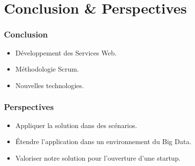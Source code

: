 \documentclass{beamer}
\begin{document}
\section{Conclusion \& Perspectives}

\begin{frame}
    \frametitle{Conclusion}
    \begin{itemize}
        \item<1-> Développement des Services Web.
        \item<2-> Méthodologie Scrum.
        \item<3-> Nouvelles technologies.
    \end{itemize}
\end{frame}

\begin{frame}
    \frametitle{Perspectives}
    \begin{itemize}
        \item<1-> Appliquer la solution dans des scénarios.
        \item<2-> Étendre l'application dans un environnement du Big Data.
        \item<3-> Valoriser notre solution pour l'ouverture d'une startup.
    \end{itemize}
\end{frame}
\end{document}
